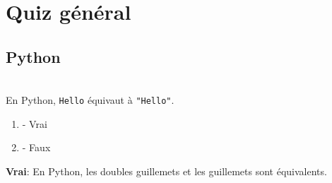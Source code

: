 \begin{Exercice}[15 minutes]
    \begin{solution}
        
    \end{solution}
    \begin{solution}
        
    \end{solution}
    
    \begin{solution}
        
    \end{solution}
    \begin{solution}
        
    \end{solution}
    \end{Exercice}
    
  
    
\section{Quiz général}

\subsection{Python}

\begin{Exercice}[2 minutes]\\
En Python, \texttt{\textquotesingle Hello\textquotesingle} équivaut à \texttt{"Hello"}. 

\begin{enumerate}
    \item - Vrai
    \item - Faux
\end{enumerate}
\begin{solution}
    \textbf{Vrai}: En Python, les doubles guillemets et les guillemets sont équivalents. 
\end{solution}
\end{Exercice}


